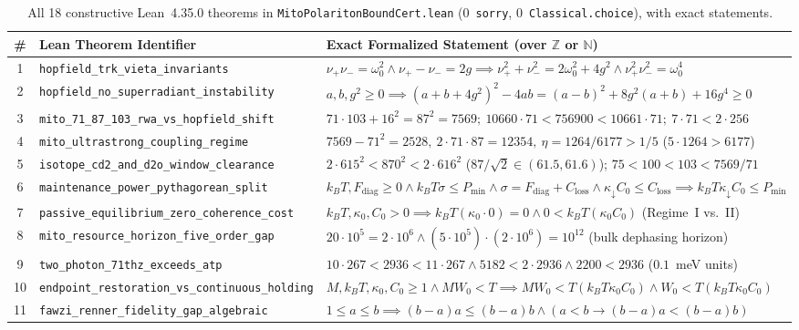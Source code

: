 \documentclass[10pt,twocolumn]{article}
\begin{document}
\begin{table}[t]
\centering
\scriptsize
\setlength{\tabcolsep}{2.8pt}
\caption{All 18 constructive Lean~4.35.0 theorems in \texttt{MitoPolaritonBoundCert.lean} (0~\texttt{sorry}, 0~\texttt{Classical.choice}), with exact statements.}
\label{tab:lean}
\begin{tabular}{@{}cll@{}}
\toprule
\# & Lean Theorem Identifier & Exact Formalized Statement (over $\mathbb{Z}$ or $\mathbb{N}$) \\
\midrule
1 & \texttt{hopfield\_trk\_vieta\_invariants} & $\nu_+\nu_-=\omega_0^2 \wedge \nu_+-\nu_-=2g \implies \nu_+^2+\nu_-^2=2\omega_0^2+4g^2 \wedge \nu_+^2\nu_-^2=\omega_0^4$ \\
2 & \texttt{hopfield\_no\_superradiant\_instability} & $a,b,g^2\ge 0 \implies (a+b+4g^2)^2-4ab = (a-b)^2+8g^2(a+b)+16g^4 \ge 0$ \\
3 & \texttt{mito\_71\_87\_103\_rwa\_vs\_hopfield\_shift} & $71\cdot 103+16^2=87^2=7569;\ 10660\cdot 71<756900<10661\cdot 71;\ 7\cdot 71<2\cdot 256$ \\
4 & \texttt{mito\_ultrastrong\_coupling\_regime} & $7569-71^2=2528,\ 2\cdot 71\cdot 87=12354,\ \eta=1264/6177 > 1/5$ ($5\cdot 1264>6177$) \\
5 & \texttt{isotope\_cd2\_and\_d2o\_window\_clearance} & $2\cdot 615^2 < 870^2 < 2\cdot 616^2$ ($87/\sqrt{2}\in(61.5,61.6)$); $75<100<103<7569/71$ \\
6 & \texttt{maintenance\_power\_pythagorean\_split} & $k_BT,F_{\mathrm{diag}}\ge 0 \wedge k_BT\sigma\le P_{\min} \wedge \sigma=F_{\mathrm{diag}}+C_{\mathrm{loss}} \wedge \kappa_\downarrow C_0\le C_{\mathrm{loss}} \implies k_BT\kappa_\downarrow C_0\le P_{\min}$ \\
7 & \texttt{passive\_equilibrium\_zero\_coherence\_cost} & $k_BT,\kappa_0,C_0>0 \implies k_BT(\kappa_0\cdot 0)=0 \wedge 0 < k_BT(\kappa_0 C_0)$ (Regime~I vs.~II) \\
8 & \texttt{mito\_resource\_horizon\_five\_order\_gap} & $20\cdot 10^5 = 2\cdot 10^6 \wedge (5\cdot 10^5)\cdot(2\cdot 10^6)=10^{12}$ (bulk dephasing horizon) \\
9 & \texttt{two\_photon\_71thz\_exceeds\_atp} & $10\cdot 267<2936<11\cdot 267 \wedge 5182<2\cdot 2936 \wedge 2200<2936$ ($0.1$~meV units) \\
10 & \texttt{endpoint\_restoration\_vs\_continuous\_holding} & $M,k_BT,\kappa_0,C_0\ge 1 \wedge M W_0 < T \implies M W_0 < T(k_BT\kappa_0 C_0) \wedge W_0 < T(k_BT\kappa_0 C_0)$ \\
11 & \texttt{fawzi\_renner\_fidelity\_gap\_algebraic} & $1\le a\le b \implies (b-a)a \le (b-a)b \wedge (a<b \to (b-a)a < (b-a)b)$ \\

\end{tabular}
\end{table}
\end{document}
